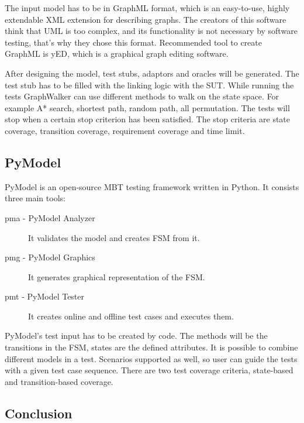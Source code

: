\documentclass{article}
\begin{document}
The input model has to be in GraphML format, which is an easy-to-use, highly extendable XML extension for describing graphs. The creators of this software think that UML is too complex, and its functionality is not necessary by software testing, that's why they chose this format. Recommended tool to create GraphML is yED, which is a graphical graph editing software.

After designing the model, test stubs, adaptors and oracles will be generated. The test stub has to be filled with the linking logic with the SUT. While running the tests GraphWalker can use different methods to walk on the state space. For example A* search, shortest path, random path, all permutation. The tests will stop when a certain stop criterion has been satisfied. The stop criteria are state coverage, transition coverage, requirement coverage and time limit.


\subsection{PyModel}
\label{sub:pymodel}

PyModel \cite{pymodelarticle}\cite{pymodel} is an open-source MBT testing framework written in Python. It consists three main tools:

\begin{description}
	\item[pma - PyModel Analyzer] It validates the model and creates FSM from it.
    \item[pmg - PyModel Graphics] It generates graphical representation of the FSM.
    \item[pmt - PyModel Tester] It creates online and offline test cases and executes them.
\end{description}

PyModel's test input has to be created by code. The methods will be the transitions in the FSM, states are the defined attributes. It is possible to combine different models in a test. Scenarios supported as well, so user can guide the tests with a given test case sequence. There are two test coverage criteria, state-based and transition-based coverage.


\subsection{Conclusion}
\label{sub:conclusion}
\end{document}
